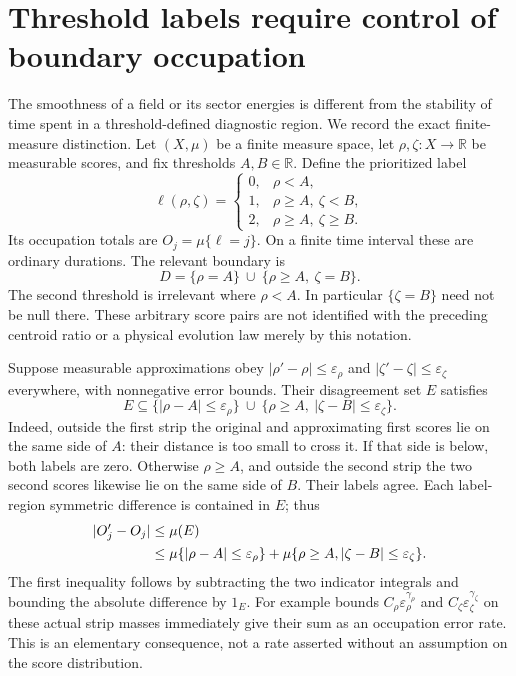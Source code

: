 \documentclass[11pt]{article}
\newcommand{\R}{\mathbb R}\newcommand{\tr}{\operatorname{tr}}
\begin{document}
\section{Threshold labels require control of boundary occupation}
The smoothness of a field or its sector energies is different from
the stability of time spent in a threshold-defined diagnostic region.
We record the exact finite-measure distinction. Let $(X,\mu)$ be a
finite measure space, let $\rho,\zeta:X\to\R$ be measurable scores,
and fix thresholds $A,B\in\R$. Define the prioritized label
\[
 \ell(\rho,\zeta)=
 \begin{cases}
 0,&\rho<A,\\
 1,&\rho\geq A,\ \zeta<B,\\
 2,&\rho\geq A,\ \zeta\geq B.
 \end{cases}
\]
Its occupation totals are $O_j=\mu\{\ell=j\}$. On a finite
time interval these are ordinary durations. The relevant boundary is
\begin{equation}\label{eq:corridorboundary}
 D=\{\rho=A\}\ \cup\ \{\rho\geq A,\ \zeta=B\}.
\end{equation}
The second threshold is irrelevant where $\rho<A$. In particular
$\{\zeta=B\}$ need not be null there. These arbitrary score pairs
are not identified with the preceding centroid ratio or a physical
evolution law merely by this notation.

Suppose measurable approximations obey
$|\rho'-\rho|\leq\varepsilon_\rho$ and
$|\zeta'-\zeta|\leq\varepsilon_\zeta$ everywhere, with
nonnegative error bounds. Their disagreement set $E$ satisfies
\begin{equation}\label{eq:corridorband}
 E\subseteq\{|\rho-A|\leq\varepsilon_\rho\}
 \ \cup\ \{\rho\geq A,\ |\zeta-B|\leq\varepsilon_\zeta\}.
\end{equation}
Indeed, outside the first strip the original and approximating
first scores lie on the same side of $A$: their distance is too
small to cross it. If that side is below, both labels are zero.
Otherwise $\rho\geq A$, and outside the second strip the two second
scores likewise lie on the same side of $B$. Their labels agree.
Each label-region symmetric difference is contained in $E$; thus
\begin{align}\label{eq:corridoroccupationbound}
 |O'_j-O_j|&\leq\mu(E)\notag\\
 &\leq\mu\{|\rho-A|\leq\varepsilon_\rho\}
       +\mu\{\rho\geq A,|\zeta-B|\leq\varepsilon_\zeta\}.
\end{align}
The first inequality follows by subtracting the two indicator
integrals and bounding the absolute difference by $1_E$.
For example bounds $C_\rho\varepsilon_\rho^{\gamma_\rho}$ and
$C_\zeta\varepsilon_\zeta^{\gamma_\zeta}$ on these actual strip
masses immediately give their sum as an occupation error rate.
This is an elementary consequence, not a rate asserted without
an assumption on the score distribution.
\end{document}

